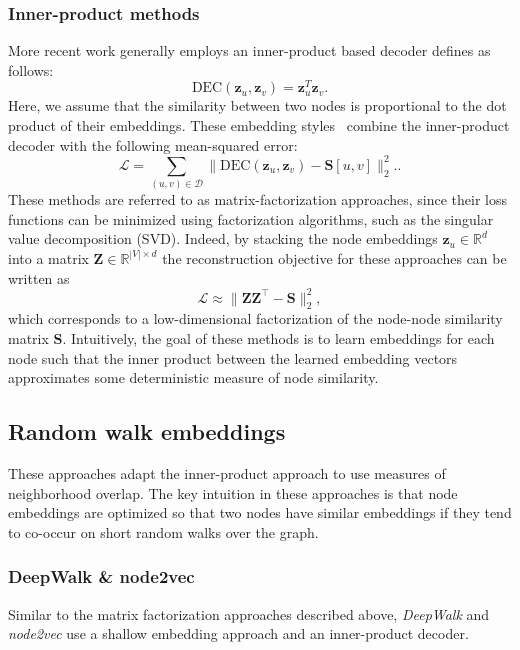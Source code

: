 \subsubsection{Inner-product methods}
More recent work generally employs an inner-product based decoder defines as follows:
\begin{equation}\label{eq:innerProductDec}
    \text{DEC}(\mathbf{z}_u, \mathbf{z}_v) = \mathbf{z}_u^T\mathbf{z}_v.
\end{equation}
Here, we assume that the similarity between two nodes is proportional to the dot product of their embeddings. These embedding styles~\cite{Ahmed2013distributedLargeScaleNaturalGraphFactorization}\cite{Cao2015grarep}\cite{Ou2016asymmetricTransitivityPreservingGraphEmbedding} combine the inner-product decoder with the following mean-squared error:
\begin{equation*}
    \mathcal{L} = \sum_{(u,v)\in\mathcal{D}} \|\text{DEC}(\mathbf{z}_u, \mathbf{z}_v) - \textbf{S}[u,v]\|_2^2..
\end{equation*}
These methods are referred to as matrix-factorization approaches, since their loss functions can be minimized using factorization algorithms, such as the singular value decomposition (SVD). Indeed, by stacking the node embeddings $\mathbf{z}_u \in \mathbb{R}^d$ into a matrix $\mathbf{Z} \in \mathbb{R}^{|V|\times d}$ the reconstruction objective for these approaches can be written as
\begin{equation*}
    \mathcal{L} \approx \|\mathbf{Z}\mathbf{Z}^\top - \textbf{S}\|_2^2,
\end{equation*}
which corresponds to a low-dimensional factorization of the node-node similarity matrix $\textbf{S}$. Intuitively, the goal of these methods is to learn embeddings for each node such that the inner product between the learned embedding vectors approximates some deterministic measure of node similarity.


\subsection{Random walk embeddings}
These approaches adapt the inner-product approach to use  measures of neighborhood overlap. The key intuition in these approaches is that node embeddings are optimized so that two nodes have similar embeddings if they tend to co-occur on short random walks over the graph.

\subsubsection{DeepWalk \& node2vec}
Similar to the matrix factorization approaches described above, \textit{DeepWalk} and \textit{node2vec} use a shallow embedding approach and an inner-product decoder.

